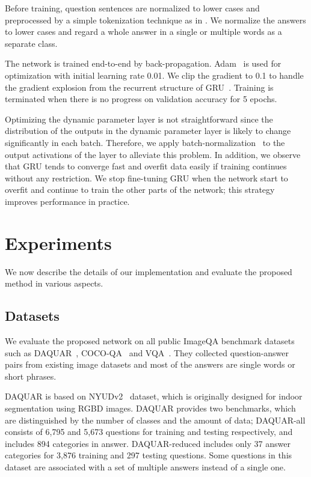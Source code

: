 \documentclass[10pt,twocolumn,letterpaper]{article}
\begin{document}
Before training, question sentences are normalized to lower cases and preprocessed by a simple tokenization technique as in \cite{Showattend}.
We normalize the answers to lower cases and regard a whole answer in a single or multiple words as a separate class.


The network is trained end-to-end by back-propagation.
Adam~\cite{Adam} is used for optimization with initial learning rate 0.01.
We clip the gradient to 0.1 to handle the gradient explosion from the recurrent structure of GRU~\cite{pascanu2013difficulty}.
Training is terminated when there is no progress on validation accuracy for 5 epochs.

Optimizing the dynamic parameter layer is not straightforward since the distribution of the outputs in the dynamic parameter layer is likely to change significantly in each batch.
Therefore, we apply batch-normalization~\cite{Batchnorm} to the output activations of the layer to alleviate this problem.
In addition, we observe that GRU tends to converge fast and overfit data easily if training continues without any restriction.
We stop fine-tuning GRU when the network start to overfit and continue to train the other parts of the network; this strategy improves performance in practice.




\section{Experiments}
\label{sec:experiment}
We now describe the details of our implementation and evaluate the proposed method in various aspects.

\subsection{Datasets}
We evaluate the proposed network on all public ImageQA benchmark datasets such as DAQUAR~\cite{Multiworld}, COCO-QA~\cite{mren2015} and VQA~\cite{VQA}. 
They collected question-answer pairs from existing image datasets and most of the answers are single words or short phrases.

DAQUAR is based on NYUDv2~\cite{Nyud} dataset, which is originally designed for indoor segmentation using RGBD images.
DAQUAR provides two benchmarks, which are distinguished by the number of classes and the amount of data; DAQUAR-all consists of 6,795 and 5,673 questions for training and testing respectively, and includes 894 categories in answer.
DAQUAR-reduced includes only 37 answer categories for 3,876 training and 297 testing questions.
Some questions in this dataset are associated with a set of multiple answers instead of a single one.
\end{document}
